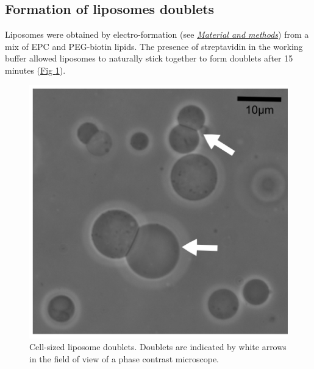 \documentclass[A4paperpaper,11pt,english]{sphinxmanual}
\begin{document}
\subsection{Formation of liposomes doublets}
\label{parts/part4:formation-of-liposomes-doublets}
Liposomes were obtained by electro-formation (see {\hyperref[parts/part2:electroformation]{\emph{Material and methods}}}) from a mix of EPC and PEG-biotin lipids. The presence of
streptavidin in the working buffer allowed liposomes to naturally stick together
to form doublets after 15 minutes (\hyperref[parts/part4:fig1a]{Fig  \ref*{parts/part4:fig1a}}).
\begin{figure}[htbp]
\centering
\capstart

\includegraphics[width=0.500\linewidth]{Fig_01-A.png}
\caption{Cell-sized liposome doublets. Doublets are indicated by white arrows in
the field of view of a phase contrast microscope.}\label{parts/part4:fig1a}\end{figure}
\end{document}
